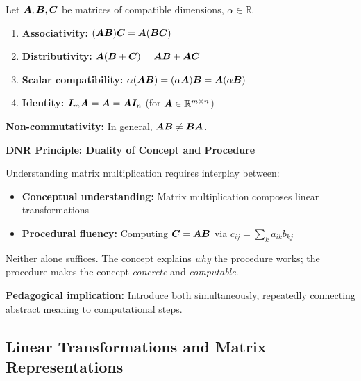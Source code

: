 \begin{theorem}
    \label{thm:matrix-mult-props}
    Let $\bm{A}, \bm{B}, \bm{C}$ be matrices of compatible dimensions, $\alpha \in \mathbb{R}$.

    \begin{enumerate}
        \item \textbf{Associativity:} $(\bm{A}\bm{B})\bm{C} = \bm{A}(\bm{B}\bm{C})$
        \item \textbf{Distributivity:} $\bm{A}(\bm{B} + \bm{C}) = \bm{A}\bm{B} + \bm{A}\bm{C}$
        \item \textbf{Scalar compatibility:} $\alpha(\bm{A}\bm{B}) = (\alpha\bm{A})\bm{B} = \bm{A}(\alpha\bm{B})$
        \item \textbf{Identity:} $\bm{I}_m \bm{A} = \bm{A} = \bm{A}\bm{I}_n$ (for $\bm{A} \in \mathbb{R}^{m \times n}$)
    \end{enumerate}

    \textbf{Non-commutativity:} In general, $\bm{A}\bm{B} \neq \bm{B}\bm{A}$.
\end{theorem}

\begin{dualitybox}
    \textbf{DNR Principle: Duality of Concept and Procedure}

    Understanding matrix multiplication requires interplay between:
    \begin{itemize}
        \item \textbf{Conceptual understanding:} Matrix multiplication composes linear transformations
        \item \textbf{Procedural fluency:} Computing $\bm{C} = \bm{A}\bm{B}$ via $c_{ij} = \sum_k a_{ik}b_{kj}$
    \end{itemize}

    Neither alone suffices. The concept explains \textit{why} the procedure works;
    the procedure makes the concept \textit{concrete} and \textit{computable}.

    \textbf{Pedagogical implication:} Introduce both simultaneously, repeatedly connecting abstract meaning to computational steps.
\end{dualitybox}

\subsection{Linear Transformations and Matrix Representations}

